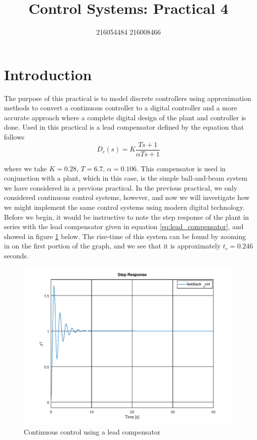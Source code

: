 \documentclass[a4paper, 12pt]{article}
\title{Control Systems: Practical 4}
\author{216054484 216008466}
\begin{document}
\maketitle
\newpage
{}
\tableofcontents
\listoffigures
\newpage
{}

\section{Introduction} %
\label{sec:introduction}
The purpose of this practical is to model discrete controllers using
approximation methods to convert a continuous controller to a digital
controller  and a more accurate approach where a complete digital design of the
plant and controller is done. Used in this practical is a lead compensator
defined by the equation that follows
\begin{equation}
	\label{eq:lead_compensator}
	D_c(s) = K \frac{Ts + 1}{\alpha Ts + 1}
\end{equation}

where we take $K = 0.28,\,T = 6.7,\,\alpha = 0.106$. This compensator is used
in conjunction with a plant, which in this case, is the simple ball-and-beam
system we have considered in a previous practical. In the previous practical,
we only considered continuous control systems, however, and now we will
investigate how we might implement the same control systems using modern
digital technology. Before we begin, it would be instructive to note the step
response of the plant in series with the lead compensator given in equation
\ref{eq:lead_compensator}, and showed in figure \ref{fig:continuous_control}
below. The rise-time of this system can be found by zooming in on the first
portion of the graph, and we see that it is approximately $t_r = 0.246$
seconds.

\begin{figure}[H]
  \centering
  \includegraphics[width=.8\textwidth]{img/continuous_control.png}
  \caption{Continuous control using a lead compensator}
  \label{fig:continuous_control}
\end{figure}
\end{document}
